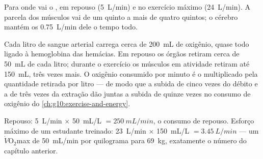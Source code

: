 \begin{omfigure}

{\small Para onde vai o , em repouso (\qty{5}{L/min}) e
no exercício máximo (\qty{24}{L/min}). A parcela dos músculos vai de um
quinto a mais de quatro quintos; o cérebro mantém os \qty{0.75}{L/min}
dele o tempo todo.}
\end{omfigure}

\begin{proposition}\label{prop:g10:heart-lungs-effort:extraction}
Cada litro de sangue arterial carrega cerca de \qty{200}{mL} de
oxigênio, quase todo ligado à hemoglobina das hemácias. Em repouso os
órgãos retiram cerca de \qty{50}{mL} de cada litro; durante o exercício
os músculos em atividade retiram até \qty{150}{mL}, três vezes mais. O
oxigênio consumido por minuto é o  multiplicado pela
quantidade retirada por litro --- de modo que a subida de cinco vezes
do débito e a de três vezes da extração dão juntas a subida de quinze
vezes no consumo de oxigênio do \cref{ch:g10:exercise-and-energy}.
\end{proposition}
\admitted

\begin{example}\label{ex:g10:heart-lungs-effort:fick}
Repouso: \qty{5}{L/min} $\times$ \qty{50}{mL/L} $= \qty{250}{mL/min}$,
o consumo de repouso. Esforço máximo de um estudante treinado:
\qty{23}{L/min} $\times$ \qty{150}{mL/L} $= \qty{3.45}{L/min}$ --- um
$\dot V\!\mathrm{O_2}$max de \qty{50}{mL/min} por quilograma para
\qty{69}{kg}, exatamente o número do capítulo anterior.
\end{example}

